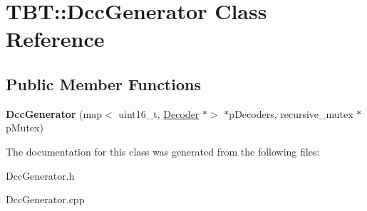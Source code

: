 \hypertarget{classTBT_1_1DccGenerator}{}\section{T\+BT\+:\+:Dcc\+Generator Class Reference}
\label{classTBT_1_1DccGenerator}
\subsection*{Public Member Functions}
\begin{DoxyCompactItemize}
\item 
\mbox{\label{classTBT_1_1DccGenerator_a42d23cfab6b78610d329f816ebfea5cf}} 
{\bfseries Dcc\+Generator} (map$<$ uint16\+\_\+t, \hyperlink{classTBT_1_1Decoder}{Decoder} $\ast$$>$ $\ast$p\+Decoders, recursive\+\_\+mutex $\ast$p\+Mutex)
\end{DoxyCompactItemize}


The documentation for this class was generated from the following files\+:\begin{DoxyCompactItemize}
\item 
Dcc\+Generator.\+h\item 
Dcc\+Generator.\+cpp\end{DoxyCompactItemize}
